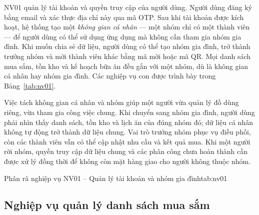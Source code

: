 NV01 quản lý tài khoản và quyền truy cập của người dùng. Người dùng đăng ký bằng email và xác thực địa chỉ này qua mã OTP. Sau khi tài khoản được kích hoạt, hệ thống tạo một \emph{không gian cá nhân} — một nhóm chỉ có một thành viên — để người dùng có thể sử dụng ứng dụng mà không cần tham gia nhóm gia đình. Khi muốn chia sẻ dữ liệu, người dùng có thể tạo nhóm gia đình, trở thành trưởng nhóm và mời thành viên khác bằng mã mời hoặc mã QR. Mọi danh sách mua sắm, tồn kho và kế hoạch bữa ăn đều gắn với một nhóm, dù là không gian cá nhân hay nhóm gia đình. Các nghiệp vụ con được trình bày trong Bảng~\ref{tab:nv01}.

Việc tách không gian cá nhân và nhóm giúp một người vừa quản lý đồ dùng riêng, vừa tham gia công việc chung. Khi chuyển sang nhóm gia đình, người dùng phải nhìn thấy danh sách, tồn kho và lịch ăn của đúng nhóm đó; dữ liệu cá nhân không tự động trở thành dữ liệu chung. Vai trò trưởng nhóm phục vụ điều phối, còn các thành viên vẫn có thể cập nhật nhu cầu và kết quả mua. Khi một người rời nhóm, quyền truy cập dữ liệu chung và các phân công chưa hoàn thành cần được xử lý đồng thời để không còn mặt hàng giao cho người không thuộc nhóm.

\begin{nvtable}{Phân rã nghiệp vụ NV01 – Quản lý tài khoản và nhóm gia đình}{tab:nv01}
\end{nvtable}

\subsection{Nghiệp vụ quản lý danh sách mua sắm}\label{ssec:nv02}


